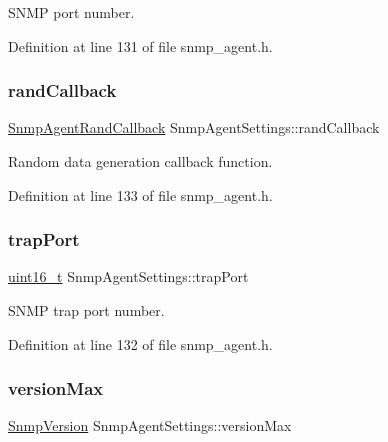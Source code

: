 S\+N\+MP port number. 



Definition at line 131 of file snmp\+\_\+agent.\+h.

\mbox{\label{structSnmpAgentSettings_a48ad68f4f7fd56d9f64acab57420398d}} 
\subsubsection{\texorpdfstring{rand\+Callback}{randCallback}}
{\footnotesize\ttfamily \hyperlink{snmp__agent_8h_a334661b589244d199b0e28790b1ab823}{Snmp\+Agent\+Rand\+Callback} Snmp\+Agent\+Settings\+::rand\+Callback}



Random data generation callback function. 



Definition at line 133 of file snmp\+\_\+agent.\+h.

\mbox{\label{structSnmpAgentSettings_a8e3e0489658544f2f39c4d0cb59d14ae}} 
\subsubsection{\texorpdfstring{trap\+Port}{trapPort}}
{\footnotesize\ttfamily \hyperlink{stdint_8h_a273cf69d639a59973b6019625df33e30}{uint16\+\_\+t} Snmp\+Agent\+Settings\+::trap\+Port}



S\+N\+MP trap port number. 



Definition at line 132 of file snmp\+\_\+agent.\+h.

\mbox{\label{structSnmpAgentSettings_a709a4c333b2d522b20c37466b50e3e9a}} 
\subsubsection{\texorpdfstring{version\+Max}{versionMax}}
{\footnotesize\ttfamily \hyperlink{snmp__common_8h_a80164b0cc3de6c48aad6917f79ee95df}{Snmp\+Version} Snmp\+Agent\+Settings\+::version\+Max}



